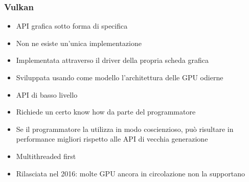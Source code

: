 \begin{frame}
\frametitle{Vulkan}

\begin{itemize}
\item API grafica sotto forma di specifica
\item Non ne esiste un'unica implementazione
\item Implementata attraverso il driver della propria scheda grafica
\item Sviluppata usando come modello l'architettura delle GPU odierne
\item API di basso livello
\item Richiede un certo know how da parte del programmatore
\item Se il programmatore la utilizza in modo coscienzioso, può risultare in performance migliori rispetto alle API di vecchia generazione
\item Multithreaded first
\item Rilasciata nel 2016: molte GPU ancora in circolazione non la supportano
\end{itemize}

\end{frame}
